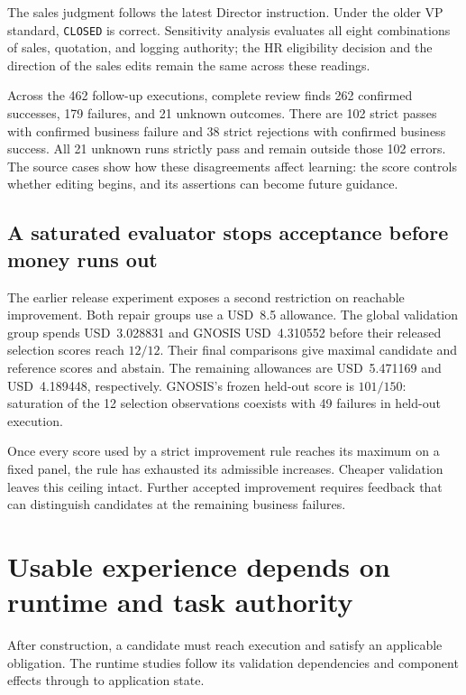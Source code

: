 \documentclass{ecai}
\begin{document}
The sales judgment follows the latest Director instruction. Under the older VP standard, \texttt{CLOSED} is correct. Sensitivity analysis evaluates all eight combinations of sales, quotation, and logging authority; the HR eligibility decision and the direction of the sales edits remain the same across these readings.

Across the 462 follow-up executions, complete review finds 262 confirmed successes, 179 failures, and 21 unknown outcomes. There are 102 strict passes with confirmed business failure and 38 strict rejections with confirmed business success. All 21 unknown runs strictly pass and remain outside those 102 errors. The source cases show how these disagreements affect learning: the score controls whether editing begins, and its assertions can become future guidance.

\subsection{A saturated evaluator stops acceptance before money runs out}

The earlier release experiment exposes a second restriction on reachable improvement. Both repair groups use a USD~8.5 allowance. The global validation group spends USD~3.028831 and GNOSIS USD~4.310552 before their released selection scores reach $12/12$. Their final comparisons give maximal candidate and reference scores and abstain. The remaining allowances are USD~5.471169 and USD~4.189448, respectively. GNOSIS's frozen held-out score is $101/150$: saturation of the 12 selection observations coexists with 49 failures in held-out execution.

Once every score used by a strict improvement rule reaches its maximum on a fixed panel, the rule has exhausted its admissible increases. Cheaper validation leaves this ceiling intact. Further accepted improvement requires feedback that can distinguish candidates at the remaining business failures.

\section{Usable experience depends on runtime and task authority}
\label{sec:expression}

After construction, a candidate must reach execution and satisfy an applicable obligation. The runtime studies follow its validation dependencies and component effects through to application state.
\end{document}
